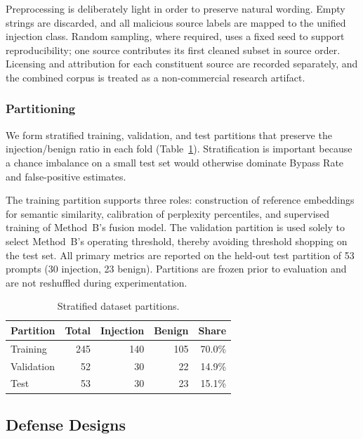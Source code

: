 Preprocessing is deliberately light in order to preserve natural wording.
Empty strings are discarded, and all malicious source labels are mapped to the unified injection class.
Random sampling, where required, uses a fixed seed to support reproducibility; one source contributes its first cleaned subset in source order.
Licensing and attribution for each constituent source are recorded separately, and the combined corpus is treated as a non-commercial research artifact.

\subsubsection{Partitioning}

We form stratified training, validation, and test partitions that preserve the injection/benign ratio in each fold (Table~\ref{tab:splits}).
Stratification is important because a chance imbalance on a small test set would otherwise dominate Bypass Rate and false-positive estimates.

The training partition supports three roles: construction of reference embeddings for semantic similarity, calibration of perplexity percentiles, and supervised training of Method~B's fusion model.
The validation partition is used solely to select Method~B's operating threshold, thereby avoiding threshold shopping on the test set.
All primary metrics are reported on the held-out test partition of 53 prompts (30 injection, 23 benign).
Partitions are frozen prior to evaluation and are not reshuffled during experimentation.

\begin{table}[t]
  \centering
  \caption{Stratified dataset partitions.}
  \label{tab:splits}
  \begin{tabular}{lrrrr}
    \hline
    Partition & Total & Injection & Benign & Share \\
    \hline
    Training & 245 & 140 & 105 & 70.0\% \\
    Validation & 52 & 30 & 22 & 14.9\% \\
    Test & 53 & 30 & 23 & 15.1\% \\
    \hline
  \end{tabular}
\end{table}

\subsection{Defense Designs}
\label{sec:defenses}

